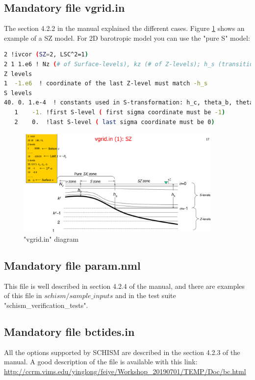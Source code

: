 \documentclass[preprints,briefreport,accept,oneauthor,pdftex]{Definitions/mdpi}
\begin{document}
\subsection{Mandatory file vgrid.in}
\noindent The section 4.2.2 in the manual explained the different cases. Figure \ref{fig:vgrid} shows an example of a SZ model. For 2D barotropic model you can use the "pure S" model:
\begin{lstlisting}[language=bash]
2 !ivcor (SZ=2, LSC^2=1)
2 1 1.e6 ! Nz (# of Surface-levels), kz (# of Z-levels); h_s (transition depth between S and Z)
Z levels
1  -1.e6  ! coordinate of the last Z-level must match -h_s
S levels
40. 0. 1.e-4  ! constants used in S-transformation: h_c, theta_b, theta_f
   1    -1. !first S-level ( first sigma coordinate must be -1)
   2    0.  !last S-level ( last sigma coordinate must be 0)
\end{lstlisting}
\begin{figure}
    \centering
    \includegraphics[width=0.9\textwidth]{figures/vgris_last.png}
    \caption{"vgrid.in" diagram}
    \label{fig:vgrid}
\end{figure}
\subsection{Mandatory file param.nml}
\noindent This file is well described in section 4.2.4 of the manual, and there are examples of this file in $schism/sample\_inputs$ and in the test suite "schism\_verification\_tests".
\subsection{Mandatory file bctides.in}
\noindent All the options supported by SCHISM are described in the section 4.2.3 of the manual. A good description of the file is available with this link:\\
\url{http://ccrm.vims.edu/yinglong/feiye/Workshop_20190701/TEMP/Doc/bc.html}
\end{document}
